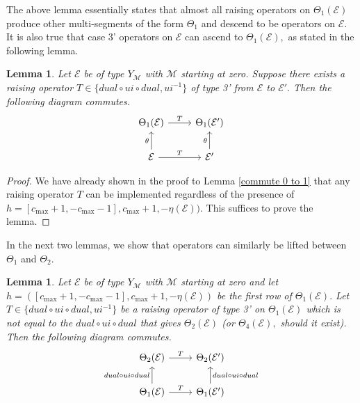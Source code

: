 \documentclass[11pt,letterpaper]{amsart}
\newcommand{\EE}{\mathcal{E}}
\newtheorem{lemma}[thm]{Lemma}
\numberwithin{equation}{section}
\begin{document}
The above lemma essentially states that almost all raising operators on $\Theta_1(\EE)$ produce other multi-segments of the form $\Theta_1$ and descend to be operators on $\EE.$ It is also true that case 3' operators on $\EE$ can ascend to $\Theta_1(\EE),$ as stated in the following lemma.

\begin{lemma}
\label{commute 1 to 0}
    Let $\EE$ be of type $Y_\mathcal{M}$ with $\mathcal{M}$ starting at zero. Suppose there exists a raising operator $T \in \{dual \circ ui \circ dual, ui^{-1}\}$ of type 3' from $\EE$ to $\EE'.$ Then the following diagram commutes.
    \[\begin{tikzcd}
	{\Theta_1(\EE)} & {\Theta_1(\EE')} \\
	{\EE} & {\EE'}
	\arrow["T", from=1-1, to=1-2]
	\arrow["\theta", from=2-1, to=1-1]
	\arrow["T", from=2-1, to=2-2]
	\arrow["\theta", from=2-2, to=1-2]
    \end{tikzcd}\]
\end{lemma}

\begin{proof}
    We have already shown in the proof to Lemma \ref{commute 0 to 1} that any raising operator $T$ can be implemented regardless of the presence of $h = [c_{\max} + 1, -c_{\max} - 1], c_{\max} + 1, -\eta(\EE))$. This suffices to prove the lemma.
\end{proof}

In the next two lemmas, we show that operators can similarly be lifted between $\Theta_1$ and $\Theta_2.$

\begin{lemma}
\label{commute 1 to 2}
    Let $\EE$ be of type $Y_\mathcal{M}$ with $\mathcal{M}$ starting at zero and let $h = ([c_{\max} + 1, -c_{\max} - 1], c_{\max} + 1, -\eta(\EE))$ be the first row of $\Theta_1(\EE).$ Let $T \in \{dual \circ ui \circ dual, ui^{-1}\}$ be a raising operator of type 3' on $\Theta_1(\EE)$ which is not equal to the $dual \circ ui \circ dual$ that gives $\Theta_2(\EE)$ (or $\Theta_4(\EE),$ should it exist). Then the following diagram commutes.
    \[\begin{tikzcd}
	{\Theta_2(\EE)} & {\Theta_2(\EE')} \\
	{\Theta_1(\EE)} & {\Theta_1(\EE')}
	\arrow["T", from=1-1, to=1-2]
	\arrow["{dual \circ ui \circ dual}", from=2-1, to=1-1]
	\arrow["T", from=2-1, to=2-2]
	\arrow["{dual \circ ui \circ dual}"', from=2-2, to=1-2]
\end{tikzcd}\]
\end{lemma}
\end{document}
